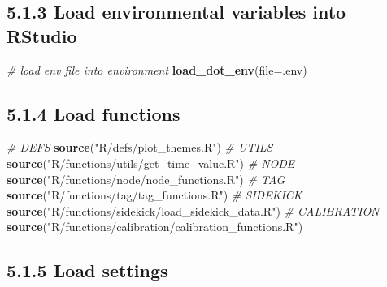 \documentclass[
]{book}
\newenvironment{Shaded}{\begin{snugshade}}{\end{snugshade}}
\newcommand{\AttributeTok}[1]{\textcolor[rgb]{0.13,0.29,0.53}{#1}}
\newcommand{\CommentTok}[1]{\textcolor[rgb]{0.56,0.35,0.01}{\textit{#1}}}
\newcommand{\FunctionTok}[1]{\textcolor[rgb]{0.13,0.29,0.53}{\textbf{#1}}}
\newcommand{\NormalTok}[1]{#1}
\newcommand{\StringTok}[1]{\textcolor[rgb]{0.31,0.60,0.02}{#1}}
\begin{document}
\subsection{5.1.3 Load environmental variables into RStudio}\label{load-environmental-variables-into-rstudio}

\begin{Shaded}
\begin{Highlighting}[]
\CommentTok{\# load env file into environment}
\FunctionTok{load\_dot\_env}\NormalTok{(}\AttributeTok{file=}\StringTok{\textquotesingle{}.env\textquotesingle{}}\NormalTok{)}
\end{Highlighting}
\end{Shaded}

\subsection{5.1.4 Load functions}\label{load-functions}

\begin{Shaded}
\begin{Highlighting}[]
\CommentTok{\# DEFS}
\FunctionTok{source}\NormalTok{(}\StringTok{"R/defs/plot\_themes.R"}\NormalTok{)}
\CommentTok{\# UTILS}
\FunctionTok{source}\NormalTok{(}\StringTok{"R/functions/utils/get\_time\_value.R"}\NormalTok{)}
\CommentTok{\# NODE}
\FunctionTok{source}\NormalTok{(}\StringTok{"R/functions/node/node\_functions.R"}\NormalTok{)}
\CommentTok{\# TAG}
\FunctionTok{source}\NormalTok{(}\StringTok{"R/functions/tag/tag\_functions.R"}\NormalTok{)}
\CommentTok{\# SIDEKICK}
\FunctionTok{source}\NormalTok{(}\StringTok{"R/functions/sidekick/load\_sidekick\_data.R"}\NormalTok{)}
\CommentTok{\# CALIBRATION}
\FunctionTok{source}\NormalTok{(}\StringTok{"R/functions/calibration/calibration\_functions.R"}\NormalTok{)}
\end{Highlighting}
\end{Shaded}

\subsection{5.1.5 Load settings}\label{load-settings}
\end{document}
